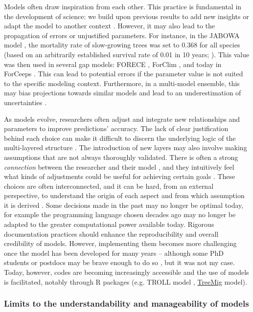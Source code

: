 Models often draw inspiration from each other. This practice is fundamental in the development of science: we build upon previous results to add new insights or adapt the model to another context \citep{Bugmann2022}. However, it may also lead to the propagation of errors or unjustified parameters. For instance, in the JABOWA model \citep{Botkin1972}, the mortality rate of slow-growing trees was set to $0.368$ for all species (based on an arbitrarily established survival rate of 0.01 in 10 years; \citealp{Kobe1995}). This value was then used in several gap models: FORECE \citep{Kienast1987}, ForClim \citep{Bugmann1996}, and today in ForCeeps \citep{Morin2021}. This can lead to potential errors if the parameter value is not suited to the specific modeling context. Furthermore, in a multi-model ensemble, this may bias projections towards similar models and lead to an underestimation of uncertainties \citep{Pathak2023}.

As models evolve, researchers often adjust and integrate new relationships and parameters to improve predictions' accuracy. 
The lack of clear justification behind each choice can make it difficult to discern the underlying logic of the multi-layered structure \citep{Harrison2021}. The introduction of new layers may also involve making assumptions that are not always thoroughly validated. There is often a strong \emph{connection} between the researcher and their model \citep{Dahan2009}, and they intuitively feel what kinds of adjustments could be useful for achieving certain goals \citep{Gramelsberger2020}. These choices are often interconnected, and it can be hard, from an external perspective, to understand the origin of each aspect and from which assumption it is derived \citep{Gramelsberger2020}. Some decisions made in the past may no longer be optimal today, for example the programming language chosen decades ago may no longer be adapted to the greater computational power available today. Rigorous documentation practices should enhance the reproducibility and overall credibility of models. However, implementing them becomes more challenging once the model has been developed for many years -- although some PhD students or postdocs may be brave enough to do so \citep{PetitCailleux2020}, but it was not my case. Today, however, codes are becoming increasingly accessible and the use of models is facilitated, notably through R packages (e.g. TROLL model \citep{Schmitt2023}, \href{https://gitlabext.wsl.ch/boehmd/treemig}{TreeMig} model).

\subsubsection{Limits to the understandability and manageability of models}

